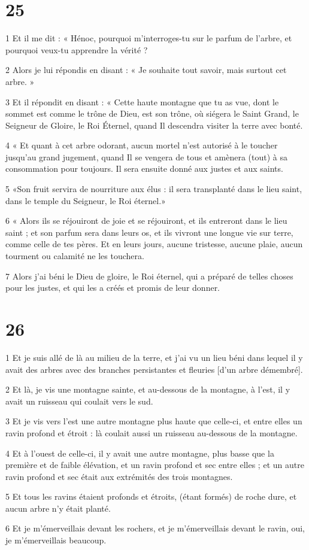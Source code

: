 \chapter{25}

\par 1 Et il me dit : « Hénoc, pourquoi m'interroges-tu sur le parfum de l'arbre, et pourquoi veux-tu apprendre la vérité ?
\par 2 Alors je lui répondis en disant : « Je souhaite tout savoir, mais surtout cet arbre. »
\par 3 Et il répondit en disant : « Cette haute montagne que tu as vue, dont le sommet est comme le trône de Dieu, est son trône, où siégera le Saint Grand, le Seigneur de Gloire, le Roi Éternel, quand Il descendra visiter la terre avec bonté.
\par 4 « Et quant à cet arbre odorant, aucun mortel n'est autorisé à le toucher jusqu'au grand jugement, quand Il se vengera de tous et amènera (tout) à sa consommation pour toujours. Il sera ensuite donné aux justes et aux saints.
\par 5 «Son fruit servira de nourriture aux élus : il sera transplanté dans le lieu saint, dans le temple du Seigneur, le Roi éternel.»
\par 6 « Alors ils se réjouiront de joie et se réjouiront, et ils entreront dans le lieu saint ; et son parfum sera dans leurs os, et ils vivront une longue vie sur terre, comme celle de tes pères. Et en leurs jours, aucune tristesse, aucune plaie, aucun tourment ou calamité ne les touchera.
\par 7 Alors j'ai béni le Dieu de gloire, le Roi éternel, qui a préparé de telles choses pour les justes, et qui les a créés et promis de leur donner.

\chapter{26}

\par 1 Et je suis allé de là au milieu de la terre, et j'ai vu un lieu béni dans lequel il y avait des arbres avec des branches persistantes et fleuries [d'un arbre démembré].
\par 2 Et là, je vis une montagne sainte, et au-dessous de la montagne, à l'est, il y avait un ruisseau qui coulait vers le sud.
\par 3 Et je vis vers l'est une autre montagne plus haute que celle-ci, et entre elles un ravin profond et étroit : là coulait aussi un ruisseau au-dessous de la montagne.
\par 4 Et à l'ouest de celle-ci, il y avait une autre montagne, plus basse que la première et de faible élévation, et un ravin profond et sec entre elles ; et un autre ravin profond et sec était aux extrémités des trois montagnes.
\par 5 Et tous les ravins étaient profonds et étroits, (étant formés) de roche dure, et aucun arbre n'y était planté.
\par 6 Et je m'émerveillais devant les rochers, et je m'émerveillais devant le ravin, oui, je m'émerveillais beaucoup.

